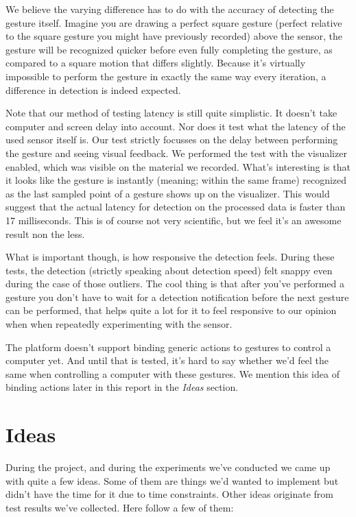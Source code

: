 \documentclass[a4paper]{article}
\begin{document}
  We believe the varying difference has to do with the accuracy of detecting the
  gesture itself. Imagine you are drawing a perfect square gesture (perfect
  relative to the square gesture you might have previously recorded) above the
  sensor, the gesture will be recognized quicker before even fully completing
  the gesture, as compared to a square motion that differs slightly. Because
  it's virtually impossible to perform the gesture in exactly the same way every
  iteration, a difference in detection is indeed expected.

  Note that our method of testing latency is still quite simplistic. It doesn't
  take computer and screen delay into account. Nor does it test what the latency
  of the used sensor itself is. Our test strictly focusses on the delay between
  performing the gesture and seeing visual feedback. We performed the test with
  the visualizer enabled, which was visible on the material we recorded. What's
  interesting is that it looks like the gesture is instantly (meaning; within
  the same frame) recognized as the last sampled point of a gesture shows up on
  the visualizer. This would suggest that the actual latency for detection on
  the processed data is faster than 17 milliseconds. This is of course not very
  scientific, but we feel it's an awesome result non the less.

  What is important though, is how responsive the detection feels. During these
  tests, the detection (strictly speaking about detection speed) felt snappy even
  during the case of those outliers. The cool thing is that after you've
  performed a gesture you don't have to wait for a detection notification before
  the next gesture can be performed, that helps quite a lot for it to feel
  responsive to our opinion when when repeatedly experimenting with the sensor.

  The platform doesn't support binding
  generic actions to gestures to control a computer yet. And until that is
  tested, it's hard to say whether we'd feel the same when controlling a
  computer with these gestures. We mention this idea of binding actions later in
  this report in the \emph{Ideas} section.

  \clearpage

  \section*{Ideas}
  During the project, and during the experiments we've conducted we came up with
  quite a few ideas. Some of them are things we'd wanted to implement but didn't
  have the time for it due to time constraints. Other ideas originate from
  test results we've collected.
  Here follow a few of them:
\end{document}
